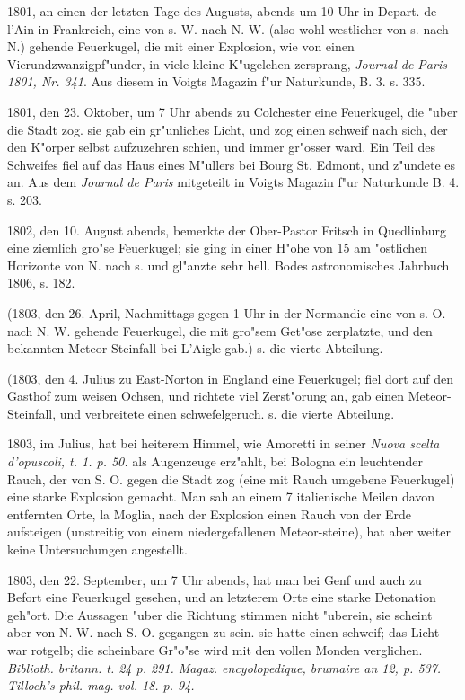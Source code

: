 \documentclass[a4paper, 11pt, oneside, polutonikogreek, german]{article}
\begin{document}
1801, an einen der letzten Tage des Augusts, abends um 10 Uhr in Depart. de l'Ain in Frankreich, eine von s. W. nach N. W. (also wohl westlicher von s. nach N.) gehende Feuerkugel, die mit einer Explosion, wie von einen Vierundzwanzigpf"under, in viele kleine K"ugelchen zersprang, \emph{Journal de Paris 1801, Nr. 341}. Aus diesem in Voigts Magazin f"ur Naturkunde, B. 3. s. 335.

1801, den 23. Oktober, um 7 Uhr abends zu Colchester eine Feuerkugel, die "uber die Stadt zog. sie gab ein gr"unliches Licht, und zog einen schweif nach sich, der den K"orper selbst aufzuzehren schien, und immer gr"osser ward. Ein Teil des Schweifes fiel auf das Haus eines M"ullers bei Bourg St. Edmont, und z"undete es an. Aus dem \emph{Journal de Paris} mitgeteilt in Voigts Magazin f"ur Naturkunde B. 4. s. 203.

1802, den 10. August abends, bemerkte der Ober-Pastor Fritsch in Quedlinburg eine ziemlich gro"se Feuerkugel; sie ging in einer H"ohe von 15 am "ostlichen Horizonte von N. nach s. und gl"anzte sehr hell. Bodes astronomisches Jahrbuch 1806, s. 182.

(1803, den 26. April, Nachmittags gegen 1 Uhr in der Normandie eine von s. O. nach N. W. gehende Feuerkugel, die mit gro"sem Get"ose zerplatzte, und den bekannten Meteor-Steinfall bei L'Aigle gab.) s. die vierte Abteilung.

(1803, den 4. Julius zu East-Norton in England eine Feuerkugel; fiel dort auf den Gasthof zum weisen Ochsen, und richtete viel Zerst"orung an, gab einen Meteor-Steinfall, und verbreitete einen schwefelgeruch. s. die vierte Abteilung.

1803, im Julius, hat bei heiterem Himmel, wie Amoretti in seiner \emph{Nuova scelta d'opuscoli, t. 1. p. 50.} als Augenzeuge erz"ahlt, bei Bologna ein leuchtender Rauch, der von S. O. gegen die Stadt zog (eine mit Rauch umgebene Feuerkugel) eine starke Explosion gemacht. Man sah an einem 7 italienische Meilen davon entfernten Orte, la Moglia, nach der Explosion einen Rauch von der Erde aufsteigen (unstreitig von einem niedergefallenen Meteor-steine), hat aber weiter keine Untersuchungen angestellt.

1803, den 22. September, um 7 Uhr abends, hat man bei Genf und auch zu Befort eine Feuerkugel gesehen, und an letzterem Orte eine starke Detonation geh"ort. Die Aussagen "uber die Richtung stimmen nicht "uberein, sie scheint aber von N. W. nach S. O. gegangen zu sein. sie hatte einen schweif; das Licht war rotgelb; die scheinbare Gr"o"se wird mit den vollen Monden verglichen. \emph{Biblioth. britann. t. 24 p. 291. Magaz. encyolopedique, brumaire an 12, p. 537. Tilloch's phil. mag. vol. 18. p. 94.}
\end{document}
